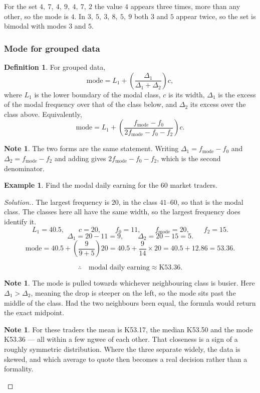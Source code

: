 \documentclass[11pt,a4paper]{article}
\theoremstyle{definition}
\newtheorem{definition}[thm]{Definition}
\newtheorem{example}[thm]{Example}
\newtheorem{note}[thm]{Note}
\newenvironment{solution}
  {\renewcommand{\qedsymbol}{}\begin{proof}[\textit{Solution}.]}
  {\end{proof}}
\begin{document}
For the set $4,\ 7,\ 4,\ 9,\ 4,\ 7,\ 2$ the value $4$ appears three times, more than any
other, so the mode is $4$. In $3,\ 5,\ 3,\ 8,\ 5,\ 9$ both $3$ and $5$ appear twice, so
the set is bimodal with modes $3$ and $5$.

\subsubsection{Mode for grouped data}

\begin{definition}
For grouped data,
$$\text{mode}=L_1+\left(\frac{\Delta_1}{\Delta_1+\Delta_2}\right)c,$$
where $L_1$ is the lower boundary of the modal class, $c$ is its width, $\Delta_1$ is
the excess of the modal frequency over that of the class below, and $\Delta_2$ its
excess over the class above. Equivalently,
$$\text{mode}=L_1+\left(\frac{f_{\text{mode}}-f_0}{2f_{\text{mode}}-f_0-f_2}\right)c.$$
\end{definition}

\begin{note}
The two forms are the same statement. Writing $\Delta_1=f_{\text{mode}}-f_0$ and
$\Delta_2=f_{\text{mode}}-f_2$ and adding gives
$2f_{\text{mode}}-f_0-f_2$, which is the second denominator.
\end{note}

\begin{example}
Find the modal daily earning for the $60$ market traders.
\end{example}

\begin{solution}
The largest frequency is $20$, in the class $41$--$60$, so that is the modal class. The
classes here all have the same width, so the largest frequency does identify it.
$$L_1=40.5,\qquad c=20,\qquad f_0=11,\qquad f_{\text{mode}}=20,\qquad f_2=15.$$
$$\Delta_1=20-11=9,\qquad \Delta_2=20-15=5.$$
$$\text{mode}=40.5+\left(\frac{9}{9+5}\right)20=40.5+\frac{9}{14}\times 20
=40.5+12.86=53.36.$$

$$\therefore\quad \text{modal daily earning}\approx\text{K}53.36.$$

\begin{note}
The mode is pulled towards whichever neighbouring class is busier. Here $\Delta_1>
\Delta_2$, meaning the drop is steeper on the left, so the mode sits past the middle of
the class. Had the two neighbours been equal, the formula would return the exact
midpoint.
\end{note}

\begin{note}
For these traders the mean is K53.17, the median K53.50 and the mode K53.36 --- all
within a few ngwee of each other. That closeness is a sign of a roughly symmetric
distribution. Where the three separate widely, the data is skewed, and which average to
quote then becomes a real decision rather than a formality.
\end{note}
\end{solution}
\end{document}
